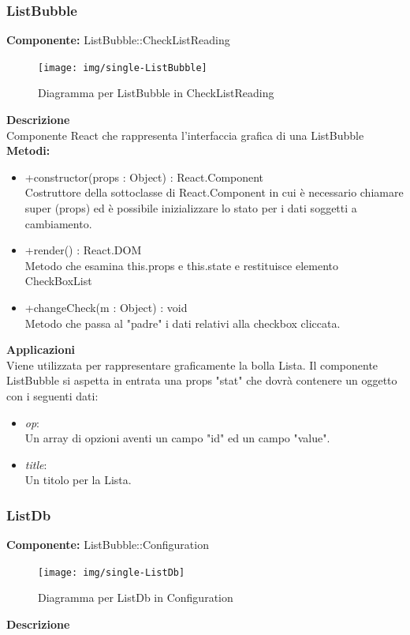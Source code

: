 \subsubsection{ListBubble}
\textbf{Componente:}  ListBubble::CheckListReading\\
   \FloatBarrier
   \begin{figure}[ht]
   \centering
   \texttt{[image: img/single-ListBubble]}
   \caption{{Diagramma per ListBubble in CheckListReading}}
\end{figure}
\FloatBarrier
\textbf{Descrizione}\\
Componente React che rappresenta l'interfaccia grafica di una ListBubble
\\
\textbf{Metodi:} 
\begin{itemize}
\item +constructor(props : Object) : React.Component 
\\
Costruttore della sottoclasse di React.Component in cui è necessario chiamare super (props) ed è possibile inizializzare lo stato per i dati soggetti a cambiamento.

\item +render() : React.DOM 
\\
Metodo che esamina this.props e this.state e restituisce elemento CheckBoxList 

\item +changeCheck(m : Object) : void \\
Metodo che passa al "padre" i dati relativi alla checkbox cliccata.
\end{itemize} 


\textbf{Applicazioni}\\
Viene utilizzata per rappresentare graficamente la bolla Lista.
Il componente ListBubble si aspetta in entrata una props "stat" che dovrà contenere un oggetto con i seguenti dati: \\
\begin{itemize}
\item \textit{op}:
\\
Un array di opzioni aventi un campo "id" ed un campo "value".
\item \textit{title}:
\\
Un titolo per la Lista.
\end{itemize} 


\clearpage

\subsubsection{ListDb}
\textbf{Componente:}  ListBubble::Configuration\\
   \FloatBarrier
   \begin{figure}[ht]
   \centering
   \texttt{[image: img/single-ListDb]}
   \caption{{Diagramma per ListDb in Configuration}}
\end{figure}
\FloatBarrier
\textbf{Descrizione}\\
 


